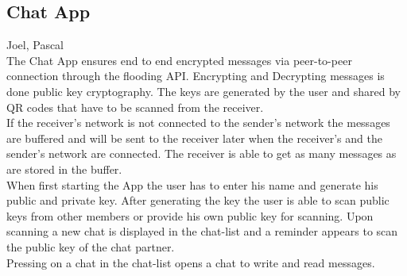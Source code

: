 		\subsection{Chat App}
		Joel, Pascal\\
			The Chat App ensures end to end encrypted messages via peer-to-peer connection through the flooding API. Encrypting and Decrypting messages is done public key cryptography. The keys are generated by the user and shared by QR codes that have to be scanned from the receiver.\\
			If the receiver's network is not connected to the sender's network the messages are buffered and will be sent to the receiver later when the receiver's and the sender's network are connected. The receiver is able to get as many messages as are stored in the buffer.\\
			When first starting the App the user has to enter his name and generate his public and private key. After generating the key the user is able to scan public keys from other members or provide his own public key for scanning. Upon scanning a new chat is displayed in the chat-list and a reminder appears to scan the public key of the chat partner. \\
			Pressing on a chat in the chat-list opens a chat to write and read messages.\\
